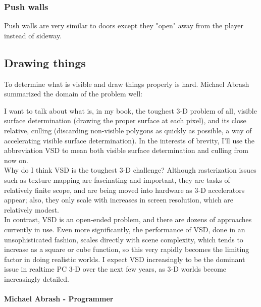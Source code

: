 \subsubsection{Push walls} 
Push walls are very similar to doors except they "open" away from the player instead of sideway.


















\subsection{Drawing things}
To determine what is visible and draw things properly is hard. Michael Abrash summarized the domain of the problem well:\\

\begin{fancyquotes}
I want to talk about what is, in my book, the toughest 3-D problem of all, visible surface determination (drawing the proper surface at each pixel), and its close relative, culling (discarding non-visible polygons as quickly as possible, a way of accelerating visible surface determination). In the interests of brevity, I’ll use the abbreviation VSD to mean both visible surface determination and culling from now on.
 \bigskip \\
Why do I think VSD is the toughest 3-D challenge? Although rasterization issues such as texture mapping are fascinating and important, they are tasks of relatively finite scope, and are being moved into hardware as 3-D accelerators appear; also, they only scale with increases in screen resolution, which are relatively modest.
 \bigskip \\
In contrast, VSD is an open-ended problem, and there are dozens of approaches currently in use. Even more significantly, the performance of VSD, done in an unsophisticated fashion, scales directly with scene complexity, which tends to increase as a square or cube function, so this very rapidly becomes the limiting factor in doing realistic worlds. I expect VSD increasingly to be the dominant issue in realtime PC 3-D over the next few years, as 3-D worlds become increasingly detailed.
 \bigskip \\
\bigskip \\
\textbf{Michael Abrash - Programmer}
 \end{fancyquotes}
 
